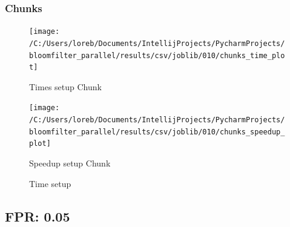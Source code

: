\documentclass[11pt]{article}
\begin{document}
    \subsubsection{Chunks}\label{subsubsec:010-chunks}
    \begin{figure}[H]
        \centering
        \texttt{[image: /C:/Users/loreb/Documents/IntellijProjects/PycharmProjects/bloomfilter\_parallel/results/csv/joblib/010/chunks\_time\_plot]}
            \caption{Times setup Chunk}\label{fig:010-chunks_time}
        \endminipage\hfill
        \texttt{[image: /C:/Users/loreb/Documents/IntellijProjects/PycharmProjects/bloomfilter\_parallel/results/csv/joblib/010/chunks\_speedup\_plot]}
            \caption{Speedup setup Chunk}\label{fig:010-chunks_speedup}
        \endminipage\hfill
        \caption{Time setup}
    \end{figure}

    \subsection{FPR: 0.05}\label{subsec:fpr-005}
\end{document}
